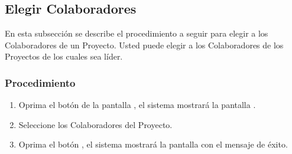 \subsection{Elegir Colaboradores}

En esta subsección se describe el procedimiento a seguir para elegir a los Colaboradores de un Proyecto. Usted puede elegir a los Colaboradores de los Proyectos de los cuales sea líder.


\subsubsection{Procedimiento}

\begin{enumerate}
	\item Oprima el botón \btnColaboradores de la pantalla , el sistema mostrará la pantalla . 

	
	\item Seleccione los Colaboradores del Proyecto.
	
	\item Oprima el botón , el sistema mostrará la pantalla  con el mensaje de éxito.
\end{enumerate}

